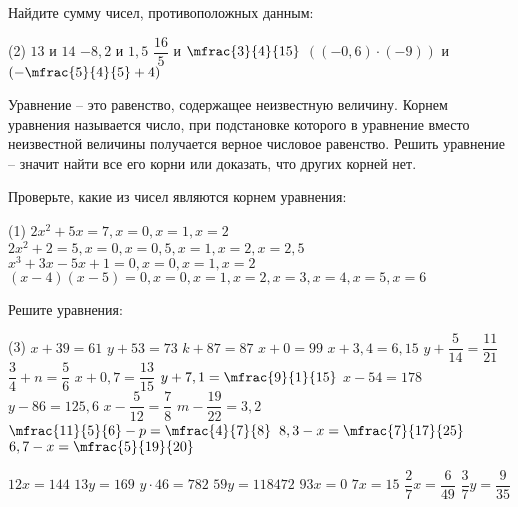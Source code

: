%
%

\begin{class}[number=1-2]
	\begin{listofex}
		\item Найдите сумму чисел, противоположных данным:
		\begin{tasks}(2)
			\task \( 13  \) и \( 14 \)
			\task \( -8,2  \) и \( 1,5 \)
			\task \( \dfrac{16}{5}  \) и \( \mfrac{3}{4}{15} \)
			\task \( ((-0,6) \cdot (-9))  \) и \( \left(-\mfrac{5}{4}{5}+4\right) \)
		\end{tasks}
		
	\end{listofex}
	\begin{definit}
		Уравнение – это равенство, содержащее неизвестную величину. Корнем уравнения называется число, при подстановке которого в уравнение вместо неизвестной величины получается верное числовое равенство. Решить уравнение – значит найти все его корни или доказать, что других корней нет.
	\end{definit}
	\begin{listofex}[resume]
		\item Проверьте, какие из чисел являются корнем уравнения:
		\begin{tasks}(1)
			\task \( 2x^2+5x=7, x=0, x=1, x=2 \)
			\task \( 2x^2+2=5, x=0, x=0,5, x=1, x=2, x=2,5 \)
			\task \( x^3 +3x-5x+1=0, x=0, x=1, x=2 \)
			\task \( (x-4)(x-5)=0, x=0, x=1, x=2, x=3, x=4, x=5, x=6 \)
		\end{tasks}
		\item Решите уравнения: %
		\begin{tasks}(3)
			\task \( x+39=61 \)
			\task \( y+53=73 \)
			\task \( k+87=87 \)
			\task \( x+0=99 \)
			\task \( x+3,4=6,15 \)
			\task \( y+\dfrac{5}{14}=\dfrac{11}{21} \)
			\task \( \dfrac{3}{4}+n=\dfrac{5}{6} \)
			\task \( x+0,7=\dfrac{13}{15} \)
			\task \( y+7,1=\mfrac{9}{1}{15} \)
			\task \( x-54=178 \)
			\task \( y-86=125,6 \)
			\task \( x-\dfrac{5}{12}=\dfrac{7}{8} \)
			\task \( m-\dfrac{19}{22}=3,2 \)
			\task \( \mfrac{11}{5}{6}-p=\mfrac{4}{7}{8} \)
			\task \( 8,3-x=\mfrac{7}{17}{25} \)
			\task \( 6,7-x=\mfrac{5}{19}{20} \)
			
			\task \( 12x=144 \)
			\task \( 13y=169 \)
			\task \( y \cdot 46=782 \)
			\task \( 59y=118472 \)
			\task \( 93x=0 \)
			\task \( 7x=15 \)
			\task \( \dfrac{2}{7}x=\dfrac{6}{49} \)
			\task \( \dfrac{3}{7}y=\dfrac{9}{35} \)
			

\end{tasks}
\end{listofex}
\end{class}

